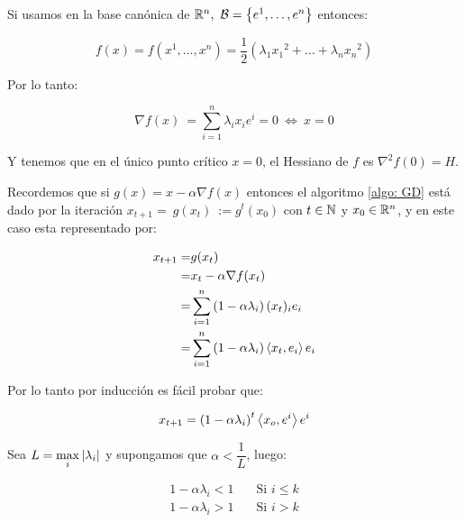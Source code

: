 \begin{example}
	
	Si usamos en la base can\'onica de $\R^n, \ \mathcal{B} = \sett{e^1, \dots, e^n}$ entonces:
	
	\begin{equation*}
	f(x) = f(x^1, \dots, x^n) = \dfrac{1}{2} \left(\lambda_1 {x_1}^2 + \dots + \lambda_n {x_n}^2\right)
	\end{equation*}
	
	Por lo tanto:
	
	\begin{equation*}
	\nabla f (x) \ = \sum\limits_{i=1}^{n} \lambda_i x_i e^i = 0 \ \Longleftrightarrow \ x = 0
	\end{equation*}
	
	
	Y tenemos que en el \'unico punto cr\'itico $x=0$, el Hessiano de $f$ es $\nabla^2 f (0) =  H$.
	
	Recordemos que si $g(x) = x - \alpha  \nabla f(x)$ entonces el algoritmo \ref{algo: GD}  est\'a dado por la iteraci\'on $x_{t+1} = \ g(x_t) \ := g^t(x_0)$ con $t \in {\mathbb{N}}$ y $x_0 \in {\mathbb{R}}^n$, y en este caso esta representado por:
	
	\begin{equation*}
	\begin{aligned}
	x_{t+1} = & g(x_t) \\
	= & x_t - \alpha\nabla f(x_t) \\
	= & \sum\limits_{i=1}^{n} \left(1 - \alpha\lambda_i\right)(x_t)_i e_i \\
	= & \sum\limits_{i=1}^{n}\left(1 - \alpha\lambda_i\right)\left\langle x_t, e_i\right\rangle e_i
	\end{aligned}
	\end{equation*}
	
	Por lo tanto por inducci\'on es f\'acil probar que:
	
	
	\begin{equation*}
	x_{t+1} = \left(1 - \alpha\lambda_i\right)^t\left\langle x_o, e^i\right\rangle e^i
	\end{equation*}
	
	Sea $L = \max\limits_i\left\lvert\lambda_i\right\rvert$ y supongamos que $\alpha < \dfrac{1}{L}$, luego:
	
	\begin{equation*}
	\begin{aligned}
	1 - \alpha \lambda_i < 1 & \quad \text{Si } i \leq k \\
	1 - \alpha \lambda_i > 1 & \quad \text{Si } i > k 
	\end{aligned}
	\end{equation*}
	

\end{example}
